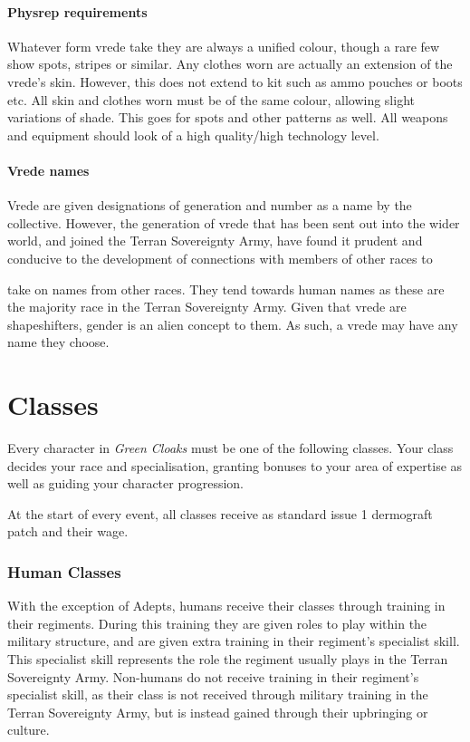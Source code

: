 \subsubsection{Physrep requirements}

Whatever form vrede take they are always a unified colour, though a rare few show spots, stripes or similar. Any clothes worn are actually an extension of the vrede's skin. However, this does not extend to kit such as ammo pouches or boots etc. All skin and clothes worn must be of the same colour, allowing slight variations of shade. This goes for spots and other patterns as well. All weapons and equipment should look of a high quality/high technology level.

\subsubsection{Vrede names}

Vrede are given designations of generation and number as a name by the collective. However, the generation of vrede that has been sent out into the wider world, and joined the Terran Sovereignty Army, have found it prudent and conducive to the development of connections with members of other races to

take on names from other races. They tend towards human names as these are the majority race in the Terran Sovereignty Army. Given that vrede are shapeshifters, gender is an alien concept to them. As such, a vrede may have any name they choose.

\chapter{Classes}

Every character in \textit{Green Cloaks} must be one of the following classes. Your class decides your race and specialisation, granting bonuses to your area of expertise as well as guiding your character progression.

At the start of every event, all classes receive as standard issue 1 dermograft patch and their wage.

\subsection{Human Classes}

With the exception of Adepts, humans receive their classes through training in their regiments. During this training they are given roles to play within the military structure, and are given extra training in their regiment's specialist skill. This specialist skill represents the role the regiment usually plays in the Terran Sovereignty Army. Non-humans do not receive training in their regiment's specialist skill, as their class is not received through military training in the Terran Sovereignty Army, but is instead gained through their upbringing or culture.

